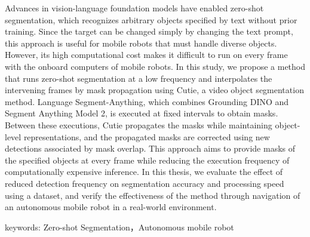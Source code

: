 Advances in vision-language foundation models have enabled zero-shot segmentation, which recognizes arbitrary objects specified by text without prior training. Since the target can be changed simply by changing the text prompt, this approach is useful for mobile robots that must handle diverse objects. However, its high computational cost makes it difficult to run on every frame with the onboard computers of mobile robots. In this study, we propose a method that runs zero-shot segmentation at a low frequency and interpolates the intervening frames by mask propagation using Cutie, a video object segmentation method. Language Segment-Anything, which combines Grounding DINO and Segment Anything Model 2, is executed at fixed intervals to obtain masks. Between these executions, Cutie propagates the masks while maintaining object-level representations, and the propagated masks are corrected using new detections associated by mask overlap. This approach aims to provide masks of the specified objects at every frame while reducing the execution frequency of computationally expensive inference. In this thesis, we evaluate the effect of reduced detection frequency on segmentation accuracy and processing speed using a dataset, and verify the effectiveness of the method through navigation of an autonomous mobile robot in a real-world environment.

keywords: Zero-shot Segmentation，Autonomous mobile robot 
%